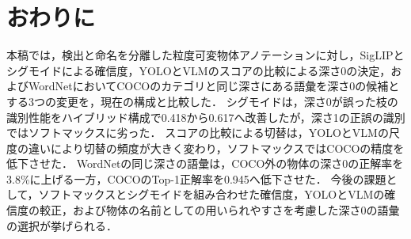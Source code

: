 \section{おわりに}
本稿では，検出と命名を分離した粒度可変物体アノテーションに対し，SigLIPとシグモイドによる確信度，YOLOとVLMのスコアの比較による深さ0の決定，およびWordNetにおいてCOCOのカテゴリと同じ深さにある語彙を深さ0の候補とする3つの変更を，現在の構成と比較した．
シグモイドは，深さ0が誤った枝の識別性能をハイブリッド構成で0.418から0.617へ改善したが，深さ1の正誤の識別ではソフトマックスに劣った．
スコアの比較による切替は，YOLOとVLMの尺度の違いにより切替の頻度が大きく変わり，ソフトマックスではCOCOの精度を低下させた．
WordNetの同じ深さの語彙は，COCO外の物体の深さ0の正解率を3.8\%に上げる一方，COCOのTop-1正解率を0.945へ低下させた．
今後の課題として，ソフトマックスとシグモイドを組み合わせた確信度，YOLOとVLMの確信度の較正，および物体の名前としての用いられやすさを考慮した深さ0の語彙の選択が挙げられる．
